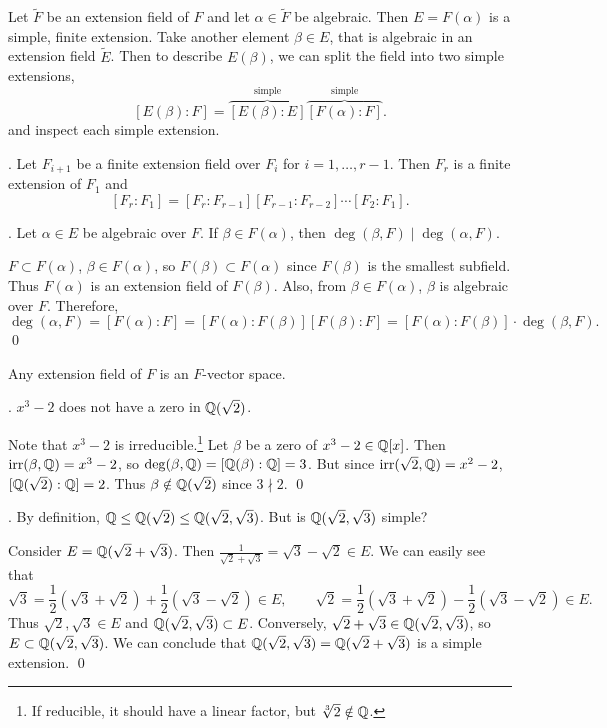 Let \(\tilde{F}\) be an extension field of \(F\) and let \(\alpha \in \tilde{F}\) be algebraic. Then \(E = F(\alpha)\) is a simple, finite extension. Take another element \(\beta \in E\), that is algebraic in an extension field \(\tilde{E}\). Then to describe \(E(\beta)\), we can split the field into two simple extensions,
\[
    [E(\beta) : F] = \overbrace{[E(\beta) : E]}^{\text{simple}} \overbrace{[F(\alpha) : F]}^{\text{simple}}.
\]
and inspect each simple extension.

\cor. Let \(F_{i+1}\) be a finite extension field over \(F_i\) for \(i = 1, \dots, r - 1\). Then \(F_r\) is a finite extension of \(F_1\) and
\[
    [F_r : F_1] = [F_r : F_{r - 1}] [F_{r - 1} : F_{r - 2}] \cdots [F_2 : F_1].
\]

\cor. Let \(\alpha \in E\) be algebraic over \(F\). If \(\beta \in F(\alpha)\), then \(\deg(\beta, F) \mid \deg(\alpha, F)\).

\pf \(F \subset F(\alpha)\), \(\beta \in F(\alpha)\), so \(F(\beta) \subset F(\alpha)\) since \(F(\beta)\) is the smallest subfield. Thus \(F(\alpha)\) is an extension field of \(F(\beta)\). Also, from \(\beta \in F(\alpha)\), \(\beta\) is algebraic over \(F\). Therefore,
\[
    \deg(\alpha, F) = [F(\alpha) : F] = [F(\alpha) : F(\beta)] [F(\beta) : F] = [F(\alpha) : F(\beta)] \cdot \deg(\beta, F).
\]
\qed

\rmk Any extension field of \(F\) is an \(F\)-vector space.

\ex. \(x^3 - 2\) does not have a zero in \(\mathbb{Q}(\sqrt{2})\).

\pf Note that \(x^3 - 2\) is irreducible.\footnote{If reducible, it should have a linear factor, but \(\sqrt[3]{2} \notin \mathbb{Q}\).} Let \(\beta\) be a zero of \(x^3 - 2 \in \mathbb{Q}[x]\). Then \(\mathrm{irr}(\beta, \mathbb{Q}) = x^3 - 2\), so \(\deg(\beta, \mathbb{Q}) = [\mathbb{Q}(\beta) : \mathbb{Q}] = 3\). But since \(\mathrm{irr}(\sqrt{2}, \mathbb{Q}) = x^2 - 2\), \([\mathbb{Q}(\sqrt{2}) : \mathbb{Q}] = 2\). Thus \(\beta \notin \mathbb{Q}(\sqrt{2})\) since \(3 \nmid 2\). \qed

\ex. By definition, \(\mathbb{Q} \leq \mathbb{Q}(\sqrt{2}) \leq \mathbb{Q}(\sqrt{2}, \sqrt{3})\). But is \(\mathbb{Q}(\sqrt{2}, \sqrt{3})\) simple?

\pf Consider \(E = \mathbb{Q}(\sqrt{2} + \sqrt{3})\). Then \(\frac{1}{\sqrt{2} + \sqrt{3}} = \sqrt{3} - \sqrt{2} \in E\). We can easily see that
\[
    \sqrt{3} = \frac{1}{2}(\sqrt{3} + \sqrt{2}) + \frac{1}{2}(\sqrt{3} - \sqrt{2}) \in E, \qquad \sqrt{2} = \frac{1}{2}(\sqrt{3} + \sqrt{2}) - \frac{1}{2}(\sqrt{3} - \sqrt{2}) \in E.
\]
Thus \(\sqrt{2}, \sqrt{3} \in E\) and \(\mathbb{Q}(\sqrt{2}, \sqrt{3}) \subset E\). Conversely, \(\sqrt{2} + \sqrt{3} \in \mathbb{Q}(\sqrt{2}, \sqrt{3})\), so \(E \subset \mathbb{Q}(\sqrt{2}, \sqrt{3})\). We can conclude that \(\mathbb{Q}(\sqrt{2}, \sqrt{3}) = \mathbb{Q}(\sqrt{2} + \sqrt{3})\) is a simple extension. \qed

